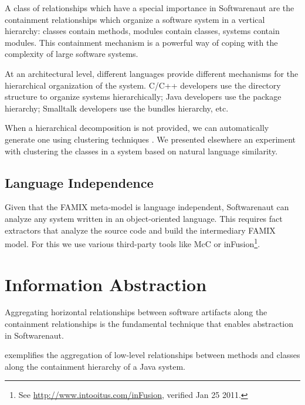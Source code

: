 \documentclass[preprint,12pt]{elsarticle}
\begin{document}
A class of relationships which have a special importance in Softwarenaut are the containment relationships which organize a software system in a vertical hierarchy: classes contain methods, modules contain classes, systems contain modules. This containment mechanism is a powerful way of coping with the complexity of large software systems.

At an architectural level, different languages provide different mechanisms for the hierarchical organization of the system. C/C++ developers use the directory structure to organize systems hierarchically; Java developers use the package hierarchy; Smalltalk developers use the bundles hierarchy, etc. 

When a hierarchical decomposition is not provided, we can automatically generate one using clustering techniques \cite{koschke-thesis}. We presented elsewhere an experiment with clustering the classes in a system based on natural language similarity\cite{Lung05a}.

\subsection {Language Independence}

Given that the FAMIX meta-model is language independent, Softwarenaut can analyze any system written in an object-oriented language. This requires fact extractors that analyze the source code and build the intermediary FAMIX model. For this we use various third-party tools like McC \cite{pepi-mcc} or inFusion\footnote{See \url{http://www.intooitus.com/inFusion}, verified Jan 25 2011.}.

\newpage

\section {Information Abstraction} \label{sec:org}

Aggregating horizontal relationships between software artifacts along the containment relationships is the fundamental technique that enables abstraction in Softwarenaut. 

 exemplifies the aggregation of low-level relationships between methods and classes along the containment hierarchy of a Java system. 
\end{document}
